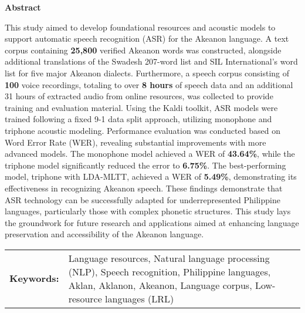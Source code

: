 \begin{center}
\textbf{Abstract}
\end{center}
\setlength{\parindent}{0pt}
This study aimed to develop foundational resources and acoustic models to support automatic speech recognition (ASR) for the Akeanon language. A text corpus containing \textbf{25,800} verified Akeanon words was constructed, alongside additional translations of the Swadesh 207-word list and SIL International's word list for five major Akeanon dialects. Furthermore, a speech corpus consisting of \textbf{100} voice recordings, totaling to over \textbf{8 hours} of speech data and an additional 31 hours of extracted audio from online resources, was collected to provide training and evaluation material. Using the Kaldi toolkit, ASR models were trained following a fixed 9-1 data split approach, utilizing monophone and triphone acoustic modeling. Performance evaluation was conducted based on Word Error Rate (WER), revealing substantial improvements with more advanced models. The monophone model achieved a WER of \textbf{43.64\%}, while the triphone model significantly reduced the error to \textbf{6.75\%}. The best-performing model, triphone with LDA-MLTT, achieved a WER of \textbf{5.49\%}, demonstrating its effectiveness in recognizing Akeanon speech. These findings demonstrate that ASR technology can be successfully adapted for underrepresented Philippine languages, particularly those with complex phonetic structures. This study lays the groundwork for future research and applications aimed at enhancing language preservation and accessibility of the Akeanon language.


\begin{tabular}{lp{4.25in}}
\hspace{-0.5em}\textbf{Keywords:}\hspace{0.25em} & Language resources, Natural language processing (NLP), Speech recognition, Philippine languages, Aklan, Aklanon, Akeanon, Language corpus, Low-resource languages (LRL)\\
\end{tabular}
